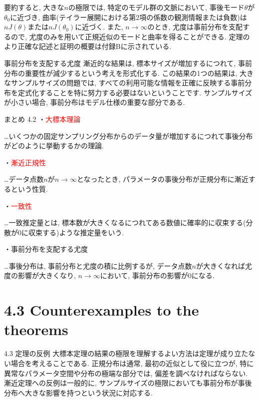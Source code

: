 \documentclass[10pt,dvipdfmx,a4]{beamer}
\newcommand{\tcr}[1]{\textcolor{red}{#1}}
\begin{document}

\begin{frame}
要約すると, 大きな$n$の極限では, 特定のモデル群の文脈において, 事後モード$\theta$が$\theta_0$に近づき, 曲率(テイラー展開における第2項の係数の観測情報または負数)は$nJ(\theta)$または$nJ(\theta_0)$に近づく.
また, $n\rightarrow\infty$のとき, 尤度は事前分布を支配するので, 尤度のみを用いて正規近似のモードと曲率を得ることができる.
定理のより正確な記述と証明の概要は付録Bに示されている.
\end{frame}


\begin{frame}{事前分布を支配する尤度}
漸近的な結果は, 標本サイズが増加するにつれて, 事前分布の重要性が減少するという考えを形式化する.
この結果の1つの結果は, 大きなサンプルサイズの問題では, すべての利用可能な情報を正確に反映する事前分布を定式化することを特に努力する必要はないということです.
サンプルサイズが小さい場合, 事前分布はモデル仕様の重要な部分である.
\end{frame}


\begin{frame}{まとめ 4.2}
・\tcr{大標本理論}

…いくつかの固定サンプリング分布からのデータ量が増加するにつれて事後分布がどのように挙動するかの理論.

・\tcr{漸近正規性}

…データ点数$n$が$n\rightarrow\infty$となったとき, パラメータの事後分布が正規分布に漸近するという性質.

・\tcr{一致性}

…一致推定量とは, 標本数が大きくなるにつれてある数値に確率的に収束する(分散が0に収束する)ような推定量をいう.

・事前分布を支配する尤度

…事後分布は, 事前分布と尤度の積に比例するが, データ点数$n$が大きくなれば尤度の影響が大きくなり, $n\rightarrow\infty$において, 事前分布の影響が0になる.
\end{frame}

\section{4.3 Counterexamples to the theorems}
\begin{frame}{4.3 定理の反例}
大標本定理の結果の極限を理解するよい方法は定理が成り立たない場合を考えることである.
正規分布は通常, 最初の近似として役に立つが, 特に異常なパラメータ空間や分布の極端な部分では, 偏差を調べなければならない.
漸近定理への反例は一般的に, サンプルサイズの極限においても事前分布が事後分布へ大きな影響を持つという状況に対応する.
\end{frame}
\end{document}
